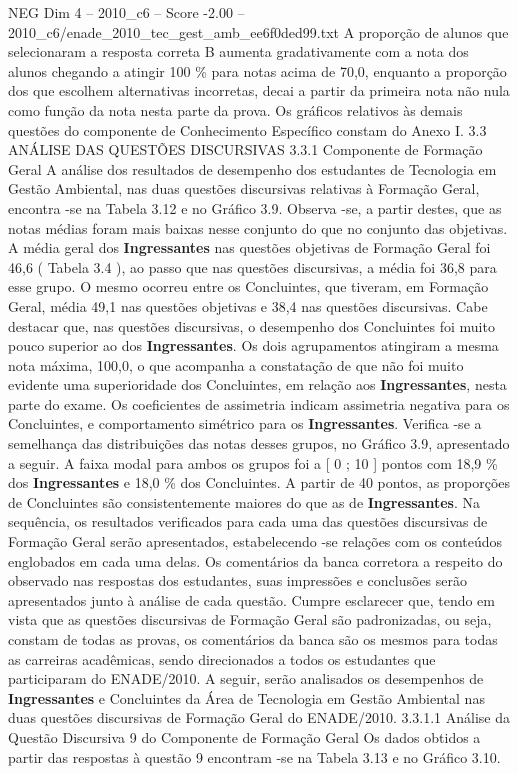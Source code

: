 \begin{textsample}{NEG Dim 4 – 2010\_c6 – Score -2.00 – 2010\_c6/enade\_2010\_tec\_gest\_amb\_ee6f0ded99.txt}
A proporção de alunos que selecionaram a resposta correta B aumenta gradativamente com a nota dos alunos chegando a atingir 100 \% para notas acima de 70,0, enquanto a proporção dos que escolhem alternativas incorretas, decai a partir da primeira nota não nula como função da nota nesta parte da prova.
Os gráficos relativos às demais questões do componente de Conhecimento Específico constam do Anexo I. 3.3 ANÁLISE DAS QUESTÕES DISCURSIVAS 3.3.1 Componente de Formação Geral A análise dos resultados de desempenho dos estudantes de Tecnologia em Gestão Ambiental, nas duas questões discursivas relativas à Formação Geral, encontra -se na Tabela 3.12 e no Gráfico 3.9.
Observa -se, a partir destes, que as notas médias foram mais baixas nesse conjunto do que no conjunto das objetivas.
A média geral dos \textbf{Ingressantes} nas questões objetivas de Formação Geral foi 46,6 ( Tabela 3.4 ), ao passo que nas questões discursivas, a média foi 36,8 para esse grupo.
O mesmo ocorreu entre os Concluintes, que tiveram, em Formação Geral, média 49,1 nas questões objetivas e 38,4 nas questões discursivas.
Cabe destacar que, nas questões discursivas, o desempenho dos Concluintes foi muito pouco superior ao dos \textbf{Ingressantes}.
Os dois agrupamentos atingiram a mesma nota máxima, 100,0, o que acompanha a constatação de que não foi muito evidente uma superioridade dos Concluintes, em relação aos \textbf{Ingressantes}, nesta parte do exame.
Os coeficientes de assimetria indicam assimetria negativa para os Concluintes, e comportamento simétrico para os \textbf{Ingressantes}.
Verifica -se a semelhança das distribuições das notas desses grupos, no Gráfico 3.9, apresentado a seguir.
A faixa modal para ambos os grupos foi a [ 0 ; 10 ] pontos com 18,9 \% dos \textbf{Ingressantes} e 18,0 \% dos Concluintes.
A partir de 40 pontos, as proporções de Concluintes são consistentemente maiores do que as de \textbf{Ingressantes}.
Na sequência, os resultados verificados para cada uma das questões discursivas de Formação Geral serão apresentados, estabelecendo -se relações com os conteúdos englobados em cada uma delas.
Os comentários da banca corretora a respeito do observado nas respostas dos estudantes, suas impressões e conclusões serão apresentados junto à análise de cada questão.
Cumpre esclarecer que, tendo em vista que as questões discursivas de Formação Geral são padronizadas, ou seja, constam de todas as provas, os comentários da banca são os mesmos para todas as carreiras acadêmicas, sendo direcionados a todos os estudantes que participaram do ENADE/2010.
A seguir, serão analisados os desempenhos de \textbf{Ingressantes} e Concluintes da Área de Tecnologia em Gestão Ambiental nas duas questões discursivas de Formação Geral do ENADE/2010. 3.3.1.1 Análise da Questão Discursiva 9 do Componente de Formação Geral Os dados obtidos a partir das respostas à questão 9 encontram -se na Tabela 3.13 e no Gráfico 3.10.

\end{textsample}
